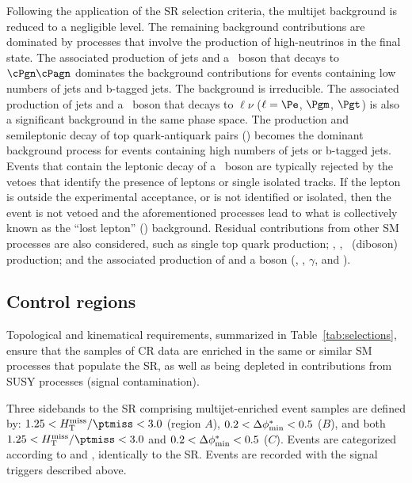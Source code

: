 Following the application of the SR selection criteria, the multijet
background is reduced to a negligible level. The remaining background
contributions are dominated by processes that involve the production
of high-\pt neutrinos in the final state. The associated production of
jets and a \cPZ\ boson that decays to $\cPgn\cPagn$ dominates the
background contributions for events containing low numbers of jets and
b-tagged jets. The \znunuj background is irreducible. The associated
production of jets and a \PW\ boson that decays to $\ell\nu$
($\ell=\Pe$, $\Pgm$, $\Pgt$) is also a significant background in the
same phase space. The production and semileptonic decay of top
quark-antiquark pairs (\ttbar) becomes the dominant background process
for events containing high numbers of jets or b-tagged jets. Events
that contain the leptonic decay of a \PW\ boson are typically rejected
by the vetoes that identify the presence of leptons or single isolated
tracks. If the lepton is outside the experimental acceptance, or is
not identified or isolated, then the event is not vetoed and the
aforementioned processes lead to what is collectively known as the
``lost lepton'' (\lost) background. Residual contributions from other
SM processes are also considered, such as single top quark production;
\PW\PW, \PW\cPZ, \cPZ\cPZ\ (diboson) production; and the associated
production of \ttbar and a boson ({\ttbar}\PW, {\ttbar}\cPZ,
{\ttbar}$\gamma$, and {\ttbar}\PH).

\subsection{Control regions}
\label{sec:control}

Topological and kinematical requirements, summarized in
Table~\ref{tab:selections}, ensure that the samples of CR data are
enriched in the same or similar SM processes that populate the SR, as
well as being depleted in contributions from SUSY processes (signal
contamination).

Three sidebands to the SR comprising multijet-enriched event samples
are defined by: $1.25 < \mhtmet < 3.0$ (region $A$), $0.2 < \Delta\phi^{*}_\text{min} <
0.5$ ($B$), and both $1.25 < \mhtmet < 3.0$ and $0.2 < \Delta\phi^{*}_\text{min} < 0.5$
($C$). Events are categorized according to \njet and \scalht,
identically to the SR. Events are recorded with the signal triggers
described above.

